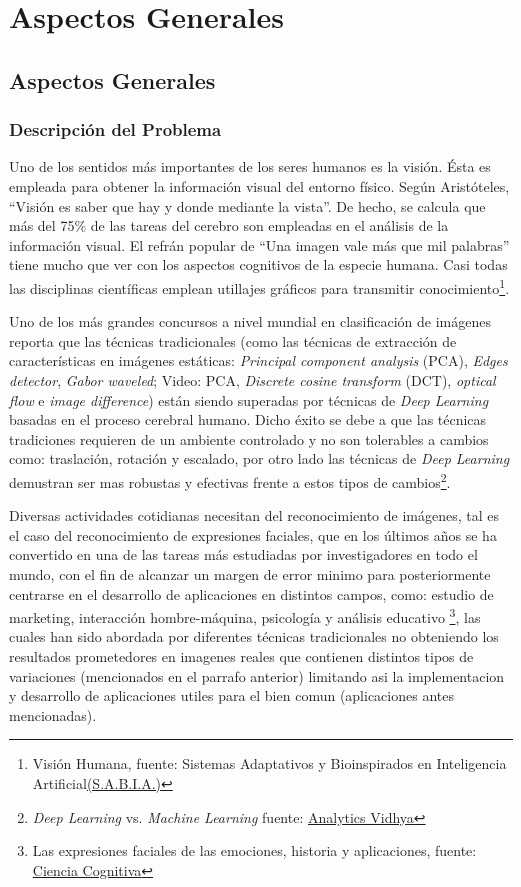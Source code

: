 \chapter{Aspectos Generales}
\section{Aspectos Generales}
\subsection{Descripción del Problema}
Uno de los sentidos más importantes de los seres humanos es la visión. Ésta es empleada para obtener la información visual del entorno físico. Según Aristóteles, “Visión es saber que hay y donde mediante la vista”. De hecho, se calcula que más del 75\% de las tareas del cerebro son empleadas en el análisis de la información visual. El refrán popular de “Una imagen vale más que mil palabras” tiene mucho que ver con los aspectos cognitivos de la especie humana. Casi todas las disciplinas científicas emplean utillajes gráficos para transmitir conocimiento\footnote[1]{Visión Humana, fuente: Sistemas Adaptativos y Bioinspirados en Inteligencia Artificial\href{http://sabia.tic.udc.es/}{(S.A.B.I.A.)}}.

Uno de los más grandes concursos a nivel mundial en clasificación de imágenes reporta que las técnicas tradicionales (como las técnicas de extracción de características en imágenes estáticas: \textit{Principal component analysis} (PCA), \textit{Edges detector}, \textit{Gabor waveled}; Video: PCA, \textit{Discrete cosine transform} (DCT), \textit{optical flow} e \textit{image difference}) están siendo superadas por técnicas de \textit{Deep Learning} basadas en el proceso cerebral humano. Dicho éxito se debe a que las técnicas tradiciones requieren de un ambiente controlado y no son tolerables a cambios como: traslación, rotación y escalado, por otro lado las técnicas de \textit{Deep Learning} demustran ser mas robustas y efectivas frente a estos tipos de cambios\footnote[2]{\textit{Deep Learning} vs. \textit{Machine Learning} fuente: \href{http://www.image-net.org/}{Analytics Vidhya}}.
	
Diversas actividades cotidianas necesitan del reconocimiento de imágenes, tal es el caso del reconocimiento de expresiones faciales, que en los últimos años se ha convertido en una de las tareas más estudiadas por investigadores en todo el mundo, con el fin de alcanzar un margen de error minimo para posteriormente centrarse en el desarrollo de aplicaciones en distintos campos, como: estudio de marketing, interacción hombre-máquina, psicología y análisis educativo \footnote[3]{Las expresiones faciales de las emociones, historia y aplicaciones, fuente: \href{http://medina-psicologia.ugr.es/cienciacognitiva/?p=664}{Ciencia Cognitiva}}, las cuales han sido abordada por diferentes técnicas tradicionales no obteniendo los resultados prometedores en imagenes reales que contienen distintos tipos de variaciones (mencionados en el parrafo anterior) limitando asi la implementacion y desarrollo de aplicaciones utiles para el bien comun (aplicaciones antes mencionadas).


